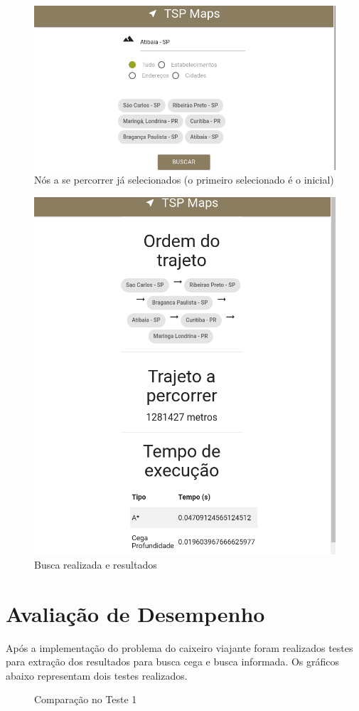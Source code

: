 \documentclass[12pt,a4paper]{article}
\begin{document}
\begin{figure}[H]
  \centering
  \includegraphics[width=0.8\linewidth]{tela2.png}
  \caption{Nós a se percorrer já selecionados (o primeiro selecionado é o inicial)}
  \label{fig:tela2}
\end{figure}
\begin{figure}[H]
  \centering
  \includegraphics[width=0.8\linewidth]{tela3.png}
  \caption{Busca realizada e resultados}
  \label{fig:tela3}
\end{figure}
\section{Avaliação de Desempenho}
Após a implementação do problema do caixeiro viajante foram realizados testes para extração dos resultados para busca cega e busca informada. Os gráficos abaixo representam dois testes realizados.
\begin{figure}[ht]
  \centering
  
  \caption{Comparação no Teste 1}
  \label{fig:2}
\end{figure}
\end{document}

